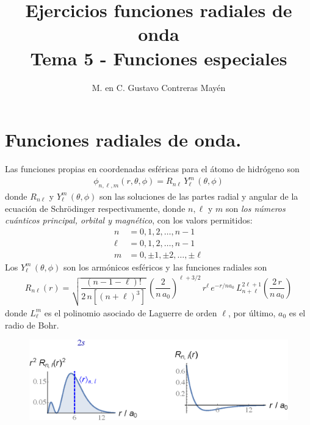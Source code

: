 
\usepackage{apacite}
\title{Ejercicios funciones radiales de onda \\ \large {Tema 5 - Funciones especiales} \vspace{-3ex}}
\author{M. en C. Gustavo Contreras Mayén}
\date{ }

\vspace{-4cm}
\maketitle
\fontsize{14}{14}\selectfont
\tableofcontents
\newpage
\section{Funciones radiales de onda.}
Las funciones propias en coordenadas esféricas para el átomo de hidrógeno son
\begin{align*}
\phi_{n,\ell, m} (r, \theta, \phi) = R_{n \ell} \, Y_{\ell}^{m} \, (\theta, \phi)
\end{align*}
donde $R_{n \ell}$ y $Y_{\ell}^{m} \, (\theta, \phi)$ son las soluciones de las partes radial y angular de la ecuación de Schrödinger respectivamente, donde $n, \ell$ y $m$ son \emph{los números cuánticos principal, orbital y magnético}, con los valors permitidos:
\begin{align*}
n &= 0, 1, 2, \ldots, n - 1 \\[0.5em]
\ell &= 0, 1, 2, \ldots, n - 1 \\[0.5em]
m &= 0, \pm 1, \pm 2, \ldots,\pm \ell
\end{align*}
Los $Y_{\ell}^{m} \, (\theta, \phi)$ son los armónicos esféricos y las funciones radiales son
\begin{align*}
R_{n \ell} (r) = \sqrt{\dfrac{(n - 1 -\ell)!}{2 \, n [(n + \ell)^{3}]}} \, \left( \dfrac{2}{n \, a_{0}} \right)^{\ell+3/2} \, r^{\ell} \, e^{-r/n a_{0}} \, L_{n+\ell}^{2 \ell+1} \left( \dfrac{2 \, r}{n \, a_{0}} \right)
\end{align*}
donde $L_{\ell}^{m}$ es el polinomio asociado de Laguerre de orden $\ell$, por último, $a_{0}$ es el radio de Bohr.

\begin{figure}[H]
    \centering
    \includegraphics[scale=1]{Imagenes/Plot_Funcion_Radial_20.eps}
\end{figure}

